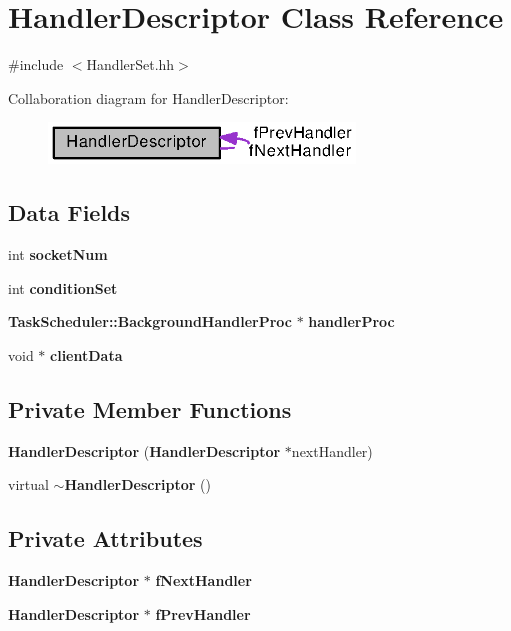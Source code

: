 \section{Handler\+Descriptor Class Reference}
\label{classHandlerDescriptor}


{\ttfamily \#include $<$Handler\+Set.\+hh$>$}



Collaboration diagram for Handler\+Descriptor\+:
\nopagebreak
\begin{figure}[H]
\begin{center}
\leavevmode
\includegraphics[width=231pt]{classHandlerDescriptor__coll__graph}
\end{center}
\end{figure}
\subsection*{Data Fields}
\begin{DoxyCompactItemize}
\item 
int {\bf socket\+Num}
\item 
int {\bf condition\+Set}
\item 
{\bf Task\+Scheduler\+::\+Background\+Handler\+Proc} $\ast$ {\bf handler\+Proc}
\item 
void $\ast$ {\bf client\+Data}
\end{DoxyCompactItemize}
\subsection*{Private Member Functions}
\begin{DoxyCompactItemize}
\item 
{\bf Handler\+Descriptor} ({\bf Handler\+Descriptor} $\ast$next\+Handler)
\item 
virtual {\bf $\sim$\+Handler\+Descriptor} ()
\end{DoxyCompactItemize}
\subsection*{Private Attributes}
\begin{DoxyCompactItemize}
\item 
{\bf Handler\+Descriptor} $\ast$ {\bf f\+Next\+Handler}
\item 
{\bf Handler\+Descriptor} $\ast$ {\bf f\+Prev\+Handler}
\end{DoxyCompactItemize}
